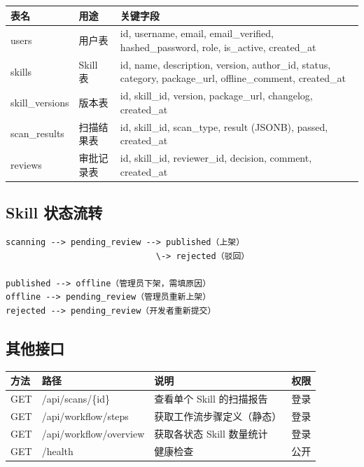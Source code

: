 \documentclass[11pt,a4paper]{article}
\begin{document}
\begin{table}[h]
\centering
\begin{tabularx}{\linewidth}{llX}
\toprule
\textbf{表名} & \textbf{用途} & \textbf{关键字段} \\
\midrule
users & 用户表 & id, username, email, email\_verified, hashed\_password, role, is\_active, created\_at \\
skills & Skill 表 & id, name, description, version, author\_id, status, category, package\_url, offline\_comment, created\_at \\
skill\_versions & 版本表 & id, skill\_id, version, package\_url, changelog, created\_at \\
scan\_results & 扫描结果表 & id, skill\_id, scan\_type, result (JSONB), passed, created\_at \\
reviews & 审批记录表 & id, skill\_id, reviewer\_id, decision, comment, created\_at \\
\bottomrule
\end{tabularx}
\end{table}

\subsection{Skill 状态流转}

\begin{verbatim}
scanning --> pending_review --> published（上架）
                              \-> rejected（驳回）

published --> offline（管理员下架，需填原因）
offline --> pending_review（管理员重新上架）
rejected --> pending_review（开发者重新提交）
\end{verbatim}

\subsection{其他接口}

\begin{table}[h]
\centering
\begin{tabularx}{\linewidth}{lllX}
\toprule
\textbf{方法} & \textbf{路径} & \textbf{说明} & \textbf{权限} \\
\midrule
GET & /api/scans/\{id\} & 查看单个 Skill 的扫描报告 & 登录 \\
GET & /api/workflow/steps & 获取工作流步骤定义（静态） & 登录 \\
GET & /api/workflow/overview & 获取各状态 Skill 数量统计 & 登录 \\
GET & /health & 健康检查 & 公开 \\
\bottomrule
\end{tabularx}
\end{table}
\end{document}

